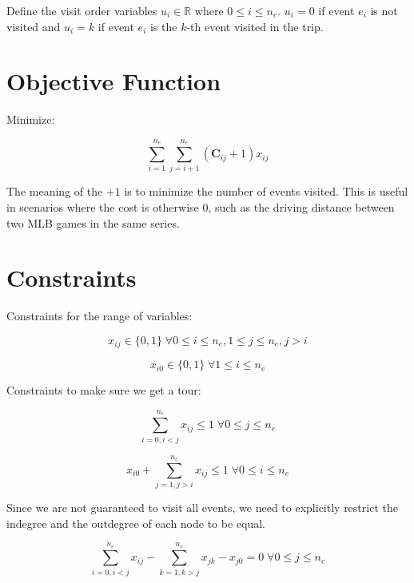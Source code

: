 \documentclass[11pt]{article}
\begin{document}
Define the visit order variables $u_i \in \mathbb{R}$ where $0 \leq i \leq n_e$. $u_i = 0$ if event $e_i$ is not visited and $u_i = k$ if event $e_i$ is the $k$-th event visited in the trip.

\section{Objective Function}
Minimize:

\begin{equation} \label{eq:objective}
\sum_{i=1}^{n_e} \sum_{j=i+1}^{n_e} (\mathbf{C}_{ij} + 1) x_{ij}
\end{equation}

The meaning of the $+1$ is to minimize the number of events visited. This is useful in scenarios where the cost is otherwise 0, such as the driving distance between two MLB games in the same series.

\section{Constraints}
Constraints for the range of variables:

\begin{equation} \label{constr:x}
    x_{ij} \in \{0, 1\} \; \forall 0 \leq i \leq n_e, 1 \leq j \leq n_e, j > i
\end{equation}

\begin{equation} \label{constr:x_dummy}
    x_{i0} \in \{0, 1\} \; \forall 1 \leq i \leq n_e
\end{equation}

Constraints to make sure we get a tour:

\begin{equation} \label{constr:in_edge}
    \sum_{i=0, i < j}^{n_e} x_{ij} \leq 1 \; \forall 0 \leq j \leq n_e
\end{equation}

\begin{equation} \label{constr:out_edge}
    x_{i0} + \sum_{j=1, j > i}^{n_e} x_{ij} \leq 1 \; \forall 0 \leq i \leq n_e
\end{equation}

Since we are not guaranteed to visit all events, we need to explicitly restrict the indegree and the outdegree of each node to be equal.

\begin{equation} \label{constr:equal_degree}
    \sum_{i=0, i < j}^{n_e} x_{ij} - \sum_{k=1, k > j}^{n_e} x_{jk} - x_{j0} = 0 \; \forall 0 \leq j \leq n_e
\end{equation}
\end{document}
